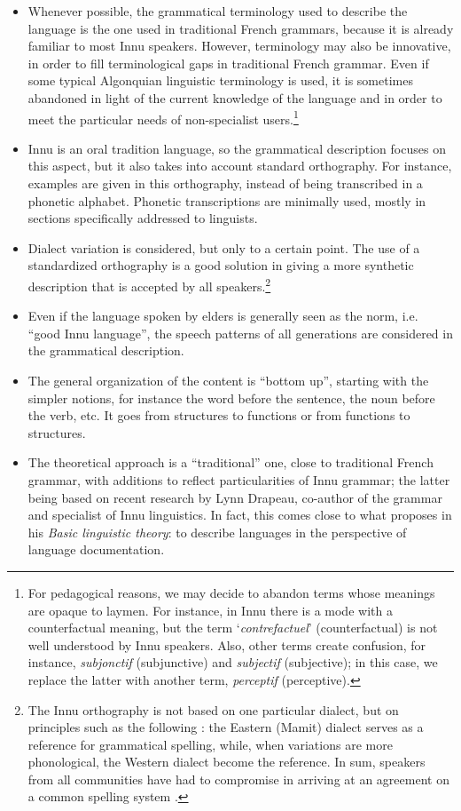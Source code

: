 \begin{itemize}
\item Whenever possible, the grammatical terminology used to describe the language is the one used in traditional French grammars, because it is already familiar to most Innu speakers. However, terminology may also be innovative, in order to fill terminological gaps in traditional French grammar. Even if some typical Algonquian linguistic terminology is used, it is sometimes abandoned in light of the current knowledge of the language and in order to meet the particular needs of non-specialist users.\footnote{For
 pedagogical reasons, we may decide to abandon terms whose meanings are opaque to laymen. For instance, in Innu there is a mode with a counterfactual meaning, but the term `\textit{contrefactuel}' (counterfactual) is not well understood by Innu speakers. Also, other terms create confusion, for instance, \textit{subjonctif} (subjunctive) and \textit{subjectif} (subjective); in this case, we replace the latter with another term, \textit{percepti}\textit{f }(perceptive).
}
\item Innu is an oral tradition language, so the grammatical description focuses on this aspect, but it also takes into account standard orthography. For instance, examples are given in this orthography, instead of being transcribed in a phonetic alphabet. Phonetic transcriptions are minimally used, mostly in sections specifically addressed to lin\-guists.
\item Dialect variation is considered, but only to a certain point. The use of a standard\-ized orthography is a good solution in giving a more synthetic description that is accepted by all speakers.\footnote{The
 Innu orthography is not based on one particular dialect, but on principles such as the following : the Eastern (Mamit) dialect serves as a reference for grammatical spelling, while, when variations are more phonological, the Western dialect become the reference. In sum, speakers from all communities have had to compromise in arriving at an agreement on a common spelling system \citep{Baraby2000, Baraby2004}.} 
\item Even if the language spoken by elders is generally seen as the norm, i.e. ``good Innu language'', the speech patterns of all generations are considered in the grammatical description.
\item The general organization of the content is ``bottom up'', starting with the simpler notions, for instance the word before the sentence, the noun before the verb, etc. It goes from structures to functions or from functions to structures.
\item The theoretical approach is a ``traditional'' one, close to traditional French grammar, with additions to reflect particularities of Innu grammar; the latter being based on recent research by Lynn Drapeau, co-author of the grammar and specialist of Innu linguistics. In fact, this comes close to what   \citet{Dixon1997,Dixon2010} proposes in his \textit{Basic linguistic theory}: to describe languages in the perspective of language documentation.
\end{itemize}
